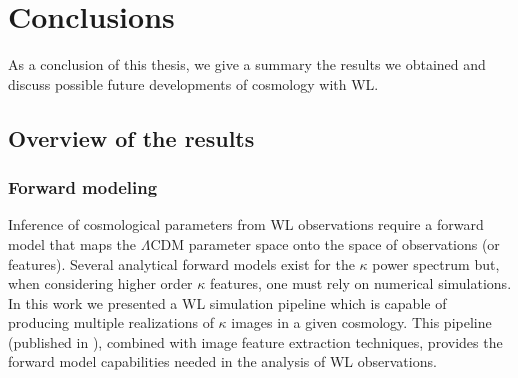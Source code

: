 
\chapter{Conclusions}
\lhead[\fancyplain{}{\thepage}]{\fancyplain{}{\rightmark}}
 \thispagestyle{plain}
\setlength{\parindent}{10mm}
\label{chp:8}


As a conclusion of this thesis, we give a summary the results we obtained and discuss possible future developments of cosmology with WL. 

\section{Overview of the results}

\subsection{Forward modeling}
Inference of cosmological parameters from WL observations require a forward model that maps the $\Lambda$CDM parameter space onto the space of observations (or features). Several analytical forward models exist for the $\kappa$ power spectrum \citep{Nicaea,Coyote2} but, when considering higher order $\kappa$ features, one must rely on numerical simulations. In this work we presented a WL simulation pipeline which is capable of producing multiple realizations of $\kappa$ images in a given cosmology. This pipeline (published in \citep{lenstools}), combined with image feature extraction techniques, provides the forward model capabilities needed in the analysis of WL observations. 

